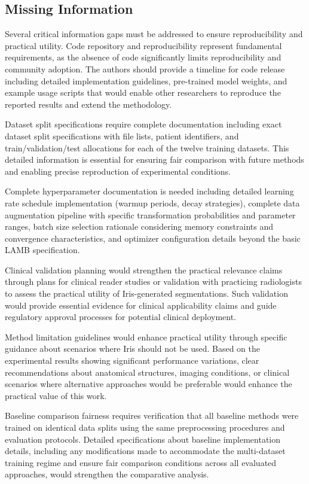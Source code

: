 \subsection*{Missing Information}
Several critical information gaps must be addressed to ensure reproducibility and practical utility. Code repository and reproducibility represent fundamental requirements, as the absence of code significantly limits reproducibility and community adoption. The authors should provide a timeline for code release including detailed implementation guidelines, pre-trained model weights, and example usage scripts that would enable other researchers to reproduce the reported results and extend the methodology.

Dataset split specifications require complete documentation including exact dataset split specifications with file lists, patient identifiers, and train/validation/test allocations for each of the twelve training datasets. This detailed information is essential for ensuring fair comparison with future methods and enabling precise reproduction of experimental conditions.

Complete hyperparameter documentation is needed including detailed learning rate schedule implementation (warmup periods, decay strategies), complete data augmentation pipeline with specific transformation probabilities and parameter ranges, batch size selection rationale considering memory constraints and convergence characteristics, and optimizer configuration details beyond the basic LAMB specification.

Clinical validation planning would strengthen the practical relevance claims through plans for clinical reader studies or validation with practicing radiologists to assess the practical utility of Iris-generated segmentations. Such validation would provide essential evidence for clinical applicability claims and guide regulatory approval processes for potential clinical deployment.

Method limitation guidelines would enhance practical utility through specific guidance about scenarios where Iris should not be used. Based on the experimental results showing significant performance variations, clear recommendations about anatomical structures, imaging conditions, or clinical scenarios where alternative approaches would be preferable would enhance the practical value of this work.

Baseline comparison fairness requires verification that all baseline methods were trained on identical data splits using the same preprocessing procedures and evaluation protocols. Detailed specifications about baseline implementation details, including any modifications made to accommodate the multi-dataset training regime and ensure fair comparison conditions across all evaluated approaches, would strengthen the comparative analysis.
